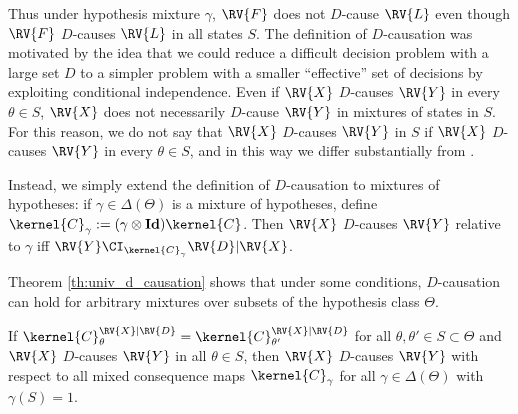Thus under hypothesis mixture $\gamma$, $\RV{F}$ does not $D$-cause $\RV{L}$ even though $\RV{F}$ $D$-causes $\RV{L}$ in all states $S$. The definition of $D$-causation was motivated by the idea that we could reduce a difficult decision problem with a large set $D$ to a simpler problem with a smaller ``effective'' set of decisions by exploiting conditional independence. Even if $\RV{X}$ $D$-causes $\RV{Y}$ in every $\theta\in S$, $\RV{X}$ does not necessarily $D$-cause $\RV{Y}$ in mixtures of states in $S$. For this reason, we do not say that $\RV{X}$ $D$-causes $\RV{Y}$ in $S$ if $\RV{X}$ $D$-causes $\RV{Y}$ in every $\theta\in S$, and in this way we differ substantially from \citet{heckerman_decision-theoretic_1995}.

Instead, we simply extend the definition of $D$-causation to mixtures of hypotheses: if $\gamma\in \Delta(\Theta)$ is a mixture of hypotheses, define $\kernel{C}_\gamma:= (\gamma\otimes\textbf{Id})\kernel{C}$. Then $\RV{X}$ $D$-causes $\RV{Y}$ relative to $\gamma$ iff $\RV{Y}\CI_{\kernel{C}_\gamma} \RV{D}|\RV{X}$.

Theorem \ref{th:univ_d_causation} shows that under some conditions, $D$-causation can hold for arbitrary mixtures over subsets of the hypothesis class $\Theta$.

\begin{theorem}\label{th:univ_d_causation}
If $\kernel{C}^{\RV{X}|\RV{D}}_{\theta} = \kernel{C}^{\RV{X}|\RV{D}}_{\theta'}$ for all $\theta,\theta'\in S\subset \Theta$ and $\RV{X}$ $D$-causes $\RV{Y}$ in all $\theta\in S$, then $\RV{X}$ $D$-causes $\RV{Y}$ with respect to all mixed consequence maps $\kernel{C}_\gamma$ for all $\gamma\in \Delta(\Theta)$ with $\gamma(S)=1$.
\end{theorem}

